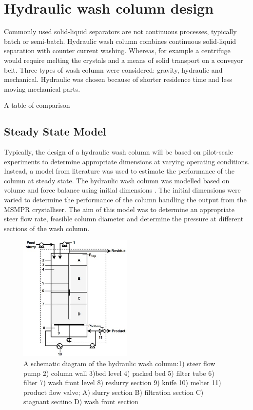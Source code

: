 \section{Hydraulic wash column design}

Commonly used solid-liquid separators are not continuous processes, typically batch or semi-batch. Hydraulic wash column combines continuous solid-liquid separation with counter current washing. Whereas, for example a centrifuge would require  melting the crystals and a means of solid transport on a conveyor belt. Three types of wash column were considered: gravity, hydraulic and mechanical. Hydraulic was chosen because of shorter residence time and less moving mechanical parts. 

A table of comparison

\subsection{Steady State Model}   

Typically, the design of a hydraulic wash column will be based on pilot-scale experiments to determine appropriate dimensions at varying operating conditions. Instead, a  model from literature \cite{van_oord-knol_hydraulic_2000} was used to estimate the performance of the column at steady state. The hydraulic wash column was modelled based on volume and force balance using initial dimensions \cite{oordknol_dynamic_2002}. The initial dimensions were varied to determine the performance of the column handling the output from the MSMPR crystalliser. The aim of this model was to determine an appropriate steer flow rate, feasible column diameter and determine the pressure at different sections of the wash column.

\begin{figure}
\centering
\includegraphics[width=0.5\textwidth]{figures/hydraulic.jpg}
\caption{A schematic diagram of the hydraulic wash column:1) steer flow pump 2) column wall 3)bed level 4) packed bed 5) filter tube 6) filter 7) wash front level 8) reslurry section 9) knife 10) melter 11) product flow valve; A) slurry section B) filtration section C) stagnant sectino D) wash front section \cite{van_oord-knol_hydraulic_2000}}
\label{fig:hydraulic}
\end{figure}

